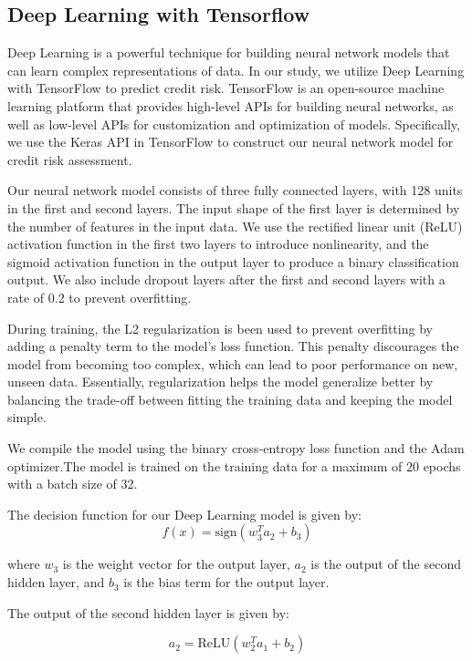 \documentclass[11pt]{article}
\begin{document}
\subsection{Deep Learning with Tensorflow}
Deep Learning is a powerful technique for building neural network models that can learn complex representations of data. In our study, we utilize Deep Learning with TensorFlow to predict credit risk. TensorFlow is an open-source machine learning platform that provides high-level APIs for building neural networks, as well as low-level APIs for customization and optimization of models. Specifically, we use the Keras API in TensorFlow to construct our neural network model for credit risk assessment.

Our neural network model consists of three fully connected layers, with 128 units in the first and second layers. The input shape of the first layer is determined by the number of features in the input data. We use the rectified linear unit (ReLU) activation function in the first two layers to introduce nonlinearity, and the sigmoid activation function in the output layer to produce a binary classification output. We also include dropout layers after the first and second layers with a rate of 0.2 to prevent overfitting.

During training, the L2 regularization is been used to prevent overfitting by adding a penalty term to the model's loss function. This penalty discourages the model from becoming too complex, which can lead to poor performance on new, unseen data. Essentially, regularization helps the model generalize better by balancing the trade-off between fitting the training data and keeping the model simple.  

We compile the model using the binary cross-entropy loss function and the Adam optimizer.The model is trained on the training data for a maximum of 20 epochs with a batch size of 32. 

The decision function for our Deep Learning model is given by:
\begin{equation}
f(x) = \text{sign}(w^T_3 a_2 + b_3)
\end{equation}

where $w_3$ is the weight vector for the output layer, $a_2$ is the output of the second hidden layer, and $b_3$ is the bias term for the output layer. 

The output of the second hidden layer is given by:

\begin{equation}
a_2 = \text{ReLU}(w^T_2 a_1 + b_2)
\end{equation}
\end{document}
